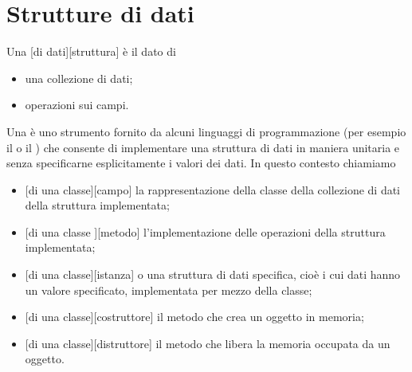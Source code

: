 \section{Strutture di dati}
\label{AlgoritmiEStruttureDiDati_StruttureDiDati}
\begin{Definition}
	Una [di dati][struttura] \`e il dato di
	\begin{itemize}
		\item una collezione di dati;
		\item operazioni sui campi.
	\end{itemize}
\end{Definition}
\begin{Definition}
	Una  \`e uno strumento fornito da alcuni linguaggi di programmazione (per esempio il  o il ) che consente di implementare una struttura di dati in maniera unitaria e senza specificarne esplicitamente i valori dei dati. In questo contesto chiamiamo
	\begin{itemize}
		\item {}[di una classe][campo] la rappresentazione della classe della collezione di dati della struttura implementata;
		\item {}[di una classe ][metodo] l'implementazione delle operazioni della struttura implementata;
		\item {}[di una classe][istanza] o  una struttura di dati specifica, cio\`e i cui dati hanno un valore specificato, implementata per mezzo della classe;
		\item {}[di una classe][costruttore] il metodo che crea un oggetto in memoria;
		\item {}[di una classe][distruttore] il metodo che libera la memoria occupata da un oggetto.
	\end{itemize}
\end{Definition}







